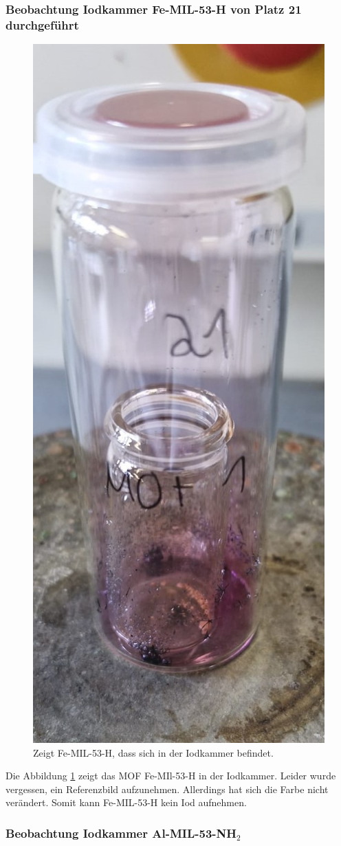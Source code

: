 \documentclass[12pt, a4paper]{article}
\begin{document}
\subsubsection{Beobachtung Iodkammer Fe-MIL-53-H von Platz 21 durchgeführt}
\begin{figure}[!h]
    \centering
    \includegraphics[width=0.25\linewidth]{MOF20I.jpg}
    \caption{Zeigt Fe-MIL-53-H, dass sich in der Iodkammer befindet.}
    \label{MOF20I}
\end{figure}

\noindent
Die Abbildung \ref{MOF20I} zeigt das MOF Fe-MIl-53-H in der Iodkammer. Leider wurde vergessen, ein Referenzbild aufzunehmen. Allerdings hat sich die Farbe nicht verändert. Somit kann Fe-MIL-53-H kein Iod aufnehmen.


\newpage
\subsubsection{\texorpdfstring{Beobachtung Iodkammer Al-MIL-53-NH$_2$}{Beobachtung Iodkammer Al-MIL-53-NH2}}
\end{document}
